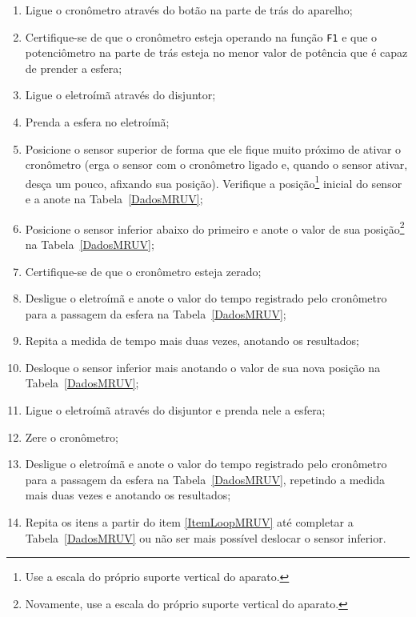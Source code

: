\begin{enumerate}
    \item Ligue o cronômetro através do botão na parte de trás do aparelho;
    \item Certifique-se de que o cronômetro esteja operando na função \texttt{F1} e que o potenciômetro na parte de trás esteja no menor valor de potência que é capaz de prender a esfera;
    \item Ligue o eletroímã através do disjuntor;
	\item Prenda a esfera no eletroímã;
	\item Posicione o sensor superior de forma que ele fique muito próximo de ativar o cronômetro (erga o sensor com o cronômetro ligado e, quando o sensor ativar, desça um pouco, afixando sua posição). Verifique a posição\footnote{Use a escala do próprio suporte vertical do aparato.} inicial do sensor e a anote na Tabela~\ref{DadosMRUV};
	\item Posicione o sensor inferior  abaixo do primeiro e anote o valor de sua posição\footnote{Novamente, use a escala do próprio suporte vertical do aparato.} na Tabela~\ref{DadosMRUV};
	\item Certifique-se de que o cronômetro esteja zerado;
	\item Desligue o eletroímã e anote o valor do tempo registrado pelo cronômetro para a passagem da esfera na Tabela~\ref{DadosMRUV};
	\item Repita a medida de tempo mais duas vezes, anotando os resultados;
	\item Desloque o sensor inferior mais  anotando o valor de sua nova posição na Tabela~\ref{DadosMRUV};\label{ItemLoopMRUV}
	\item Ligue o eletroímã através do disjuntor e prenda nele a esfera;
	\item Zere o cronômetro;
	\item Desligue o eletroímã e anote o valor do tempo registrado pelo cronômetro para a passagem da esfera na Tabela~\ref{DadosMRUV}, repetindo a medida mais duas vezes e anotando os resultados;
	\item Repita os itens a partir do item \ref{ItemLoopMRUV} até completar a Tabela~\ref{DadosMRUV} ou não ser mais possível deslocar o sensor inferior.
\end{enumerate}

\cleardoublepage

